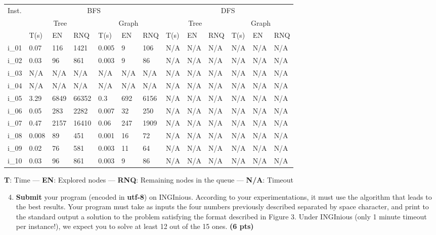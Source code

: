 \documentclass[11pt,a4paper]{../template/report}
\begin{document}
\begin{answers}[7cm]
\small
\begin{center}
\begin{tabular}{||l|l|l|l|l|l|l|l|l|l|l|l|l||}
\hline
\multirow{3}{*}{Inst.} & \multicolumn{6}{c|}{BFS} & \multicolumn{6}{c||}{DFS} \\
\cline{2-13}
& \multicolumn{3}{c|}{Tree} & \multicolumn{3}{c|}{Graph} & \multicolumn{3}{c|}{Tree} & \multicolumn{3}{c||}{Graph}\\
\cline{2-13}
 & T(s) & EN & RNQ & T(s) & EN & RNQ & T(s) & EN & RNQ & T(s) & EN & RNQ\\
\hline
i\_01 & 0.07 & 116 & 1421 & 0.005 & 9 & 106 & N/A & N/A & N/A & N/A & N/A & N/A \\
\hline
i\_02 & 0.03 & 96 & 861 & 0.003 & 9 & 86 & N/A & N/A & N/A & N/A & N/A & N/A \\
\hline
i\_03 & N/A & N/A & N/A & N/A & N/A & N/A & N/A & N/A & N/A & N/A & N/A & N/A \\
\hline
i\_04 & N/A & N/A & N/A & N/A & N/A & N/A & N/A & N/A & N/A & N/A & N/A & N/A \\
\hline
i\_05 & 3.29 & 6849 & 66352 & 0.3 & 692 & 6156 & N/A & N/A & N/A & N/A & N/A & N/A \\
\hline
i\_06 & 0.05 & 283 & 2282 & 0.007 & 32 & 250 & N/A & N/A & N/A & N/A & N/A & N/A \\
\hline
i\_07 & 0.47 & 2157 & 16410 & 0.06 & 247 & 1909 & N/A & N/A & N/A & N/A & N/A & N/A \\
\hline
i\_08 & 0.008 & 89 & 451 & 0.001 & 16 & 72 & N/A & N/A & N/A & N/A & N/A & N/A \\
\hline
i\_09 & 0.02 & 76 & 581 & 0.003 & 11 & 64 & N/A & N/A & N/A & N/A & N/A & N/A \\
\hline
i\_10 & 0.03 & 96 & 861 & 0.003 & 9 & 86 & N/A & N/A & N/A & N/A & N/A & N/A \\
\hline
\end{tabular}
\end{center}
\textbf{T}: Time — \textbf{EN}: Explored nodes —
\textbf{RNQ}: Remaining nodes in the queue — \textbf{N/A}: Timeout
\end{answers}



\begin{enumerate}
\setcounter{enumi}{3}
    \item \textbf{Submit} your program (encoded in \textbf{utf-8}) on INGInious. According to your experimentations, it must use the algorithm that leads to the best results. Your program must take as inputs the four numbers previously described separated by space character, and print to the standard output a solution to the problem satisfying the format described in Figure 3. Under INGInious (only 1 minute timeout per instance!), we expect you to solve at least 12 out of the 15 ones. \textbf{(6 pts)}
\end{enumerate}
\end{document}
